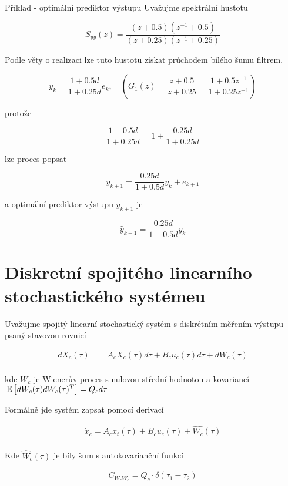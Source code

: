 \begin{note}{Příklad - optimální prediktor výstupu}
Uvažujme spektrální hustotu

\[ S_{yy}(z) = \frac{(z+0.5)(z^{-1}+0.5)}{(z+0.25)(z^{-1}+0.25)} \]

Podle věty o realizaci lze tuto hustotu získat průchodem bílého šumu filtrem.

\[ y_k = \frac{1+0.5d}{1+0.25d}e_k,\quad \left(G_1(z) = \frac{z+0.5}{z+0.25} = \frac{1+0.5z^{-1}}{1+0.25z^{-1}} \right) \]

protože

\[ \frac{1+0.5d}{1+0.25d} = 1+\frac{0.25d}{1+0.25d} \]

lze proces popsat

\[ y_{k+1} = \frac{0.25d}{1+0.5d}y_k+e_{k+1} \]

a optimální prediktor výstupu $y_{k+1}$ je

\[ \widehat{y}_{k+1} = \frac{0.25d}{1+0.5d}y_k \]

\end{note}




\section{Diskretní spojitého linearního stochastického systémeu}
\label{sec:Diskretní spojitého linearního stochastického systémeu}

Uvažujme spojitý linearní stochastický systém s diskrétním měřením výstupu psaný stavovou rovnicí

\begin{align}
  d X_c (\tau) &= A_c X_c(\tau) d \tau + B_c u_c (\tau) d \tau + d W_c (\tau) \\
\end{align}

kde $W_c$ je Wienerův proces s nulovou střední hodnotou a kovariancí $\,\mathrm{E}\left[d W_c(\tau)dW_c(\tau)^T\right] =  Q_c d \tau$

Formálně jde systém zapsat pomocí derivací

\begin{align}
  \dot{x}_c = A_c x_t(\tau) +B_c u_c(\tau) + \hat{W_c}(\tau) \\
\end{align}

Kde $\hat{W}_c(\tau)$ je bíly šum s autokovarianční funkcí

\begin{align}
  C_{W_{c}W_{c}} = Q_c \cdot \delta(\tau_1 - \tau_2)
\end{align}

